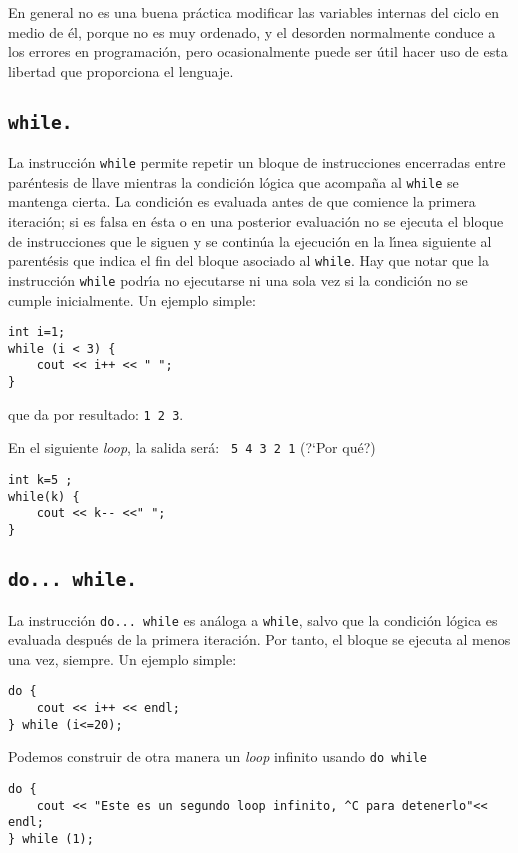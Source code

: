En general no es una buena pr\'actica modificar las variables internas
del ciclo en medio de \'el, porque no es muy ordenado, y el desorden
normalmente conduce a los errores en programaci\'on, pero
ocasionalmente puede ser \'util hacer uso de esta libertad que
proporciona el lenguaje.

\subsection{\tt while.}
La instrucci{\'o}n \verb|while| permite repetir un bloque de instrucciones
encerradas entre par{\'e}ntesis de llave mientras la condici{\'o}n l{\'o}gica que
acompa{\~n}a al \verb|while| se mantenga cierta. La condici{\'o}n es evaluada
antes de que comience la primera iteraci{\'o}n; si es falsa en {\'e}sta o en
una posterior evaluaci{\'o}n no se ejecuta el bloque de instrucciones que
le siguen y se contin{\'u}a la ejecuci{\'o}n en la l{\'\i}nea siguiente al
parent{\'e}sis que indica el fin del bloque asociado al \verb|while|. Hay
que notar que la instrucci{\'o}n \verb|while| podr{\'\i}a no ejecutarse ni una
sola vez si la condici{\'o}n no se cumple inicialmente. Un ejemplo
simple:
\begin{verbatim}
int i=1;
while (i < 3) {
    cout << i++ << " ";
}
\end{verbatim}
que da por resultado: \verb+1 2 3+.

En el siguiente {\it loop}, la salida ser{\'a}: \verb| 5 4 3 2 1| (?`Por qu{\'e}?)
\begin{verbatim}
int k=5 ;
while(k) {
    cout << k-- <<" ";
}
\end{verbatim}

\subsection{\tt do... while.}
La instrucci{\'o}n \verb|do... while| es an\'aloga a \verb+while+,
salvo que la condici\'on l\'ogica es evaluada despu\'es de la primera
iteraci\'on. Por tanto, el bloque se ejecuta al
 menos una vez, siempre. Un ejemplo simple:
\begin{verbatim}
do {
    cout << i++ << endl;
} while (i<=20);
\end{verbatim}

Podemos construir de otra manera un {\it loop} infinito usando
\verb|do while|
\begin{verbatim}
do {
    cout << "Este es un segundo loop infinito, ^C para detenerlo"<< endl;
} while (1);
\end{verbatim}

